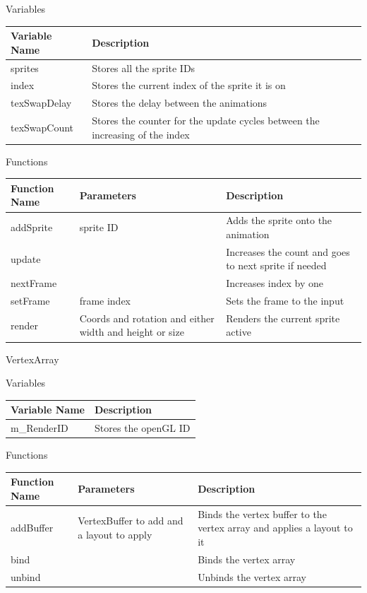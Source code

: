 \documentclass[../../Main.tex]{subfiles}
\begin{document}
    \begin{center}
        Variables
        \begin{tabular}{ | m{} | m{} | }
            \hline
            \textbf{Variable Name} & \textbf{Description} \\
            \hline
            sprites & Stores all the sprite IDs \\
            \hline
            index & Stores the current index of the sprite it is on \\
            \hline
            texSwapDelay & Stores the delay between the animations \\
            \hline
            texSwapCount & Stores the counter for the update cycles between the increasing of the index \\
            \hline
        \end{tabular}
        Functions
        \begin{tabular}{ | m{} | m{}| m{} | }
            \hline
            \textbf{Function Name} & \textbf{Parameters} & \textbf{Description} \\
            \hline
            addSprite & sprite ID & Adds the sprite onto the animation \\
            \hline
            update & & Increases the count and goes to next sprite if needed \\
            \hline
            nextFrame & & Increases index by one \\
            \hline
            setFrame & frame index & Sets the frame to the input \\
            \hline
            render & Coords and rotation and either width and height or size & Renders the current sprite active \\
            \hline
        \end{tabular}
    \end{center}
    VertexArray
    \begin{center}
        Variables
        \begin{tabular}{ | m{} | m{} | }
            \hline
            \textbf{Variable Name} & \textbf{Description} \\
            \hline
            m\_RenderID & Stores the openGL ID \\
            \hline
        \end{tabular}
        Functions
        \begin{tabular}{ | m{} | m{}| m{} | }
            \hline
            \textbf{Function Name} & \textbf{Parameters} & \textbf{Description} \\
            \hline
            addBuffer & VertexBuffer to add and a layout to apply & Binds the vertex buffer to the vertex array and applies a layout to it \\
            \hline
            bind & & Binds the vertex array \\
            \hline
            unbind & & Unbinds the vertex array \\
            \hline
        \end{tabular}
    \end{center}
\end{document}
